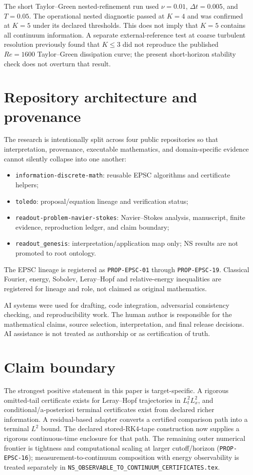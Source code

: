 \documentclass[11pt]{article}
\theoremstyle{definition}
\begin{document}
The short Taylor--Green nested-refinement run used $\nu=0.01$, $\Delta t=0.005$, and $T=0.05$.
The operational nested diagnostic passed at $K=4$ and was confirmed at $K=5$ under its declared
thresholds.  This does not imply that $K=5$ contains all continuum information.  A separate
external-reference test at coarse turbulent resolution previously found that $K\le3$ did not
reproduce the published $Re=1600$ Taylor--Green dissipation curve; the present short-horizon
stability check does not overturn that result.

\section{Repository architecture and provenance}

The research is intentionally split across four public repositories so that interpretation,
provenance, executable mathematics, and domain-specific evidence cannot silently collapse into one
another:
\begin{itemize}
\item \texttt{information-discrete-math}: reusable EPSC algorithms and certificate helpers;
\item \texttt{toledo}: proposal/equation lineage and verification status;
\item \texttt{readout-problem-navier-stokes}: Navier--Stokes analysis, manuscript, finite evidence,
      reproduction ledger, and claim boundary;
\item \texttt{readout\_genesis}: interpretation/application map only; NS results are not promoted to
      root ontology.
\end{itemize}
The EPSC lineage is registered as \texttt{PROP-EPSC-01} through \texttt{PROP-EPSC-19}.  Classical
Fourier, energy, Sobolev, Leray--Hopf and relative-energy inequalities are registered for lineage
and role, not claimed as original mathematics.

AI systems were used for drafting, code integration, adversarial consistency checking, and
reproducibility work.  The human author is responsible for the mathematical claims, source
selection, interpretation, and final release decisions.  AI assistance is not treated as authorship
or as certification of truth.

\section{Claim boundary}

The strongest positive statement in this paper is target-specific.  A rigorous omitted-tail
certificate exists for Leray--Hopf trajectories in $L^2_tL^2_x$, and conditional/a-posteriori
terminal certificates exist from declared richer information.  A residual-based adapter converts
a certified comparison path into a terminal $L^2$ bound.  The declared stored-RK4-tape construction
now supplies a rigorous continuous-time enclosure for that path.  The remaining outer numerical
frontier is tightness and computational scaling at larger cutoff/horizon (\texttt{PROP-EPSC-16});
measurement-to-continuum composition with energy observability is treated separately in
\texttt{NS\_OBSERVABLE\_TO\_CONTINUUM\_CERTIFICATES.tex}.
\end{document}
